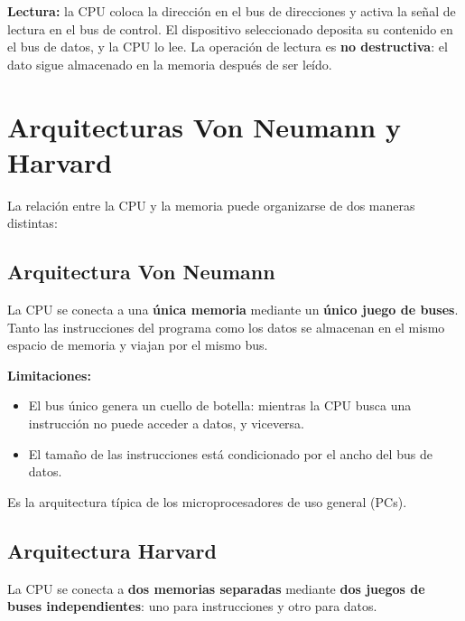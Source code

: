 \textbf{Lectura:} la CPU coloca la dirección en el bus de direcciones y activa la señal de lectura en el bus de control. El dispositivo seleccionado deposita su contenido en el bus de datos, y la CPU lo lee. La operación de lectura es \textbf{no destructiva}: el dato sigue almacenado en la memoria después de ser leído.

\section{Arquitecturas Von Neumann y Harvard}

La relación entre la CPU y la memoria puede organizarse de dos maneras distintas:

\subsection{Arquitectura Von Neumann}

La CPU se conecta a una \textbf{única memoria} mediante un \textbf{único juego de buses}. Tanto las instrucciones del programa como los datos se almacenan en el mismo espacio de memoria y viajan por el mismo bus.


\textbf{Limitaciones:}
\begin{itemize}
  \item El bus único genera un cuello de botella: mientras la CPU busca una instrucción no puede acceder a datos, y viceversa.
  \item El tamaño de las instrucciones está condicionado por el ancho del bus de datos.
\end{itemize}

Es la arquitectura típica de los microprocesadores de uso general (PCs).

\subsection{Arquitectura Harvard}

La CPU se conecta a \textbf{dos memorias separadas} mediante \textbf{dos juegos de buses independientes}: uno para instrucciones y otro para datos.


